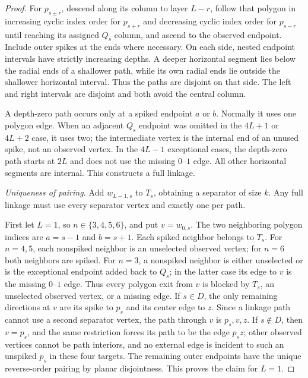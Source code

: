 \documentclass[11pt]{article}
\theoremstyle{definition}
\begin{document}
\begin{proof}
For $p_{s\pm r}$, descend along its column to layer $L-r$,
follow that polygon in increasing cyclic index order for $p_{s+r}$
and decreasing cyclic index order for $p_{s-r}$ until reaching its
assigned $Q_s$ column, and ascend to the observed endpoint. Include outer
spikes at the ends where necessary. On each side, nested endpoint
intervals have strictly increasing depths. A deeper horizontal
segment lies below the radial ends of a shallower path, while its
own radial ends lie outside the shallower horizontal interval.
Thus the paths are disjoint on that side. The left and right
intervals are disjoint and both avoid the central column.

A depth-zero path occurs only at a spiked endpoint $a$ or $b$.
Normally it uses one polygon edge. When an adjacent $Q_s$ endpoint
was omitted in the $4L+1$ or $4L+2$ case, it uses two; the
intermediate vertex is the internal end of an unused spike, not
an observed vertex. In the $4L-1$ exceptional cases, the
depth-zero path starts at $2L$ and does not use the missing
$0$--$1$ edge. All other horizontal segments are internal.
This constructs a full linkage.

\emph{Uniqueness of pairing.}
Add $w_{L-1,s}$ to $T_s$, obtaining a separator of size $k$.
Any full linkage must use every separator vertex and exactly one
per path.

First let $L=1$, so $n\in\{3,4,5,6\}$, and put $v=w_{0,s}$.
The two neighboring polygon indices are $a=s-1$ and $b=s+1$.
Each spiked neighbor belongs to $T_s$. For $n=4,5$, each
nonspiked neighbor is an unselected observed vertex; for $n=6$
both neighbors are spiked. For $n=3$, a nonspiked neighbor is
either unselected or is the exceptional endpoint added back to
$Q_s$; in the latter case its edge to $v$ is the missing
$0$--$1$ edge. Thus every polygon exit from $v$ is blocked by
$T_s$, an unselected observed vertex, or a missing edge.
If $s\in D$, the only remaining directions at $v$ are its spike
to $p_s$ and its center edge to $z$. Since a linkage path cannot
use a second separator vertex, the path through $v$ is
$p_s,v,z$. If $s\notin D$, then $v=p_s$, and the same restriction
forces its path to be the edge $p_sz$; other observed vertices
cannot be path interiors, and no external edge is incident to
such an unspiked $p_s$ in these four targets.
The remaining outer endpoints have
the unique reverse-order pairing by planar disjointness.
This proves the claim for $L=1$.


\end{proof}
\end{document}
